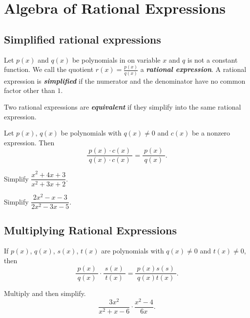 

\section{Algebra of Rational
Expressions}


\subsection{Simplified rational expressions}
Let \(p(x)\) and \(q(x)\) be polynomials in on variable \(x\) and \(q\) is not a
constant function. We call the quotient \(r(x)=\frac{p(x)}{q(x)}\) a
\textbf{\emph{rational expression}}. A rational expression is
\textbf{\emph{simplified}} if the numerator and the denominator have no
common factor other than \(1\).

Two rational expressions are \textbf{\emph{equivalent}} if they simplify into the same rational expression.

Let \(p(x)\), \(q(x)\) be polynomials with \(q(x)\neq 0\) and \(c(x)\)
be a nonzero expression. Then \[
\frac{~p(x)\cdot c(x)~}{~q(x)\cdot c(x)~}=\frac{~p(x)~}{~q(x)~}.
\]

\begin{example}
  Simplify \(\dfrac{x^2+4x+3}{x^2+3x+2}\).
\end{example}
\vspace*{4\baselineskip}

\begin{example}
  Simplify \(\dfrac{2x^2-x-3}{2x^2-3x-5}\).
\end{example}
\vspace*{4\baselineskip}

\hypertarget{multiplying-rational-expressions}{%
\subsection{Multiplying Rational
Expressions}\label{multiplying-rational-expressions}}

If \(p(x)\), \(q(x)\), \(s(x)\), \(t(x)\) are polynomials with \(q(x)\neq 0\) and
\(t(x)\neq 0\), then \[
\frac{~p(x)~}{~q(x)~}\cdot\frac{~s(x)~}{~t(x)~}=\frac{~p(x)s(s)~}{~q(x)t(x)~}.
\]

\begin{example}
  Multiply and then simplify.
  \[\frac{3x^2}{x^2+x-6}\cdot\frac{x^2-4}{6x}.\]
\end{example}
\vspace*{4\baselineskip}

